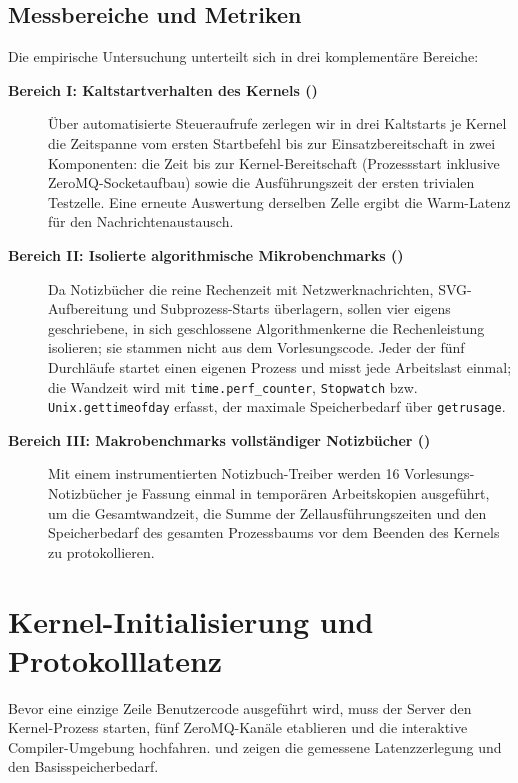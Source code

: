 \subsection{Messbereiche und Metriken}
Die empirische Untersuchung unterteilt sich in drei komplementäre Bereiche:
\begin{description}
  \item[\textbf{Bereich I: Kaltstartverhalten des Kernels ()}] 
  Über automatisierte Steueraufrufe zerlegen wir in drei Kaltstarts je Kernel die Zeitspanne vom ersten Startbefehl bis zur Einsatzbereitschaft in zwei Komponenten: die Zeit bis zur Kernel-Bereitschaft (Prozessstart inklusive ZeroMQ-Socketaufbau) sowie die Ausführungszeit der ersten trivialen Testzelle.
  Eine erneute Auswertung derselben Zelle ergibt die Warm-Latenz für den Nachrichtenaustausch.

  \item[\textbf{Bereich II: Isolierte algorithmische Mikrobenchmarks ()}]
  Da Notizbücher die reine Rechenzeit mit Netzwerknachrichten, SVG-Aufbereitung und Subprozess-Starts überlagern, sollen vier eigens geschriebene, in sich geschlossene Algorithmenkerne die Rechenleistung isolieren; sie stammen nicht aus dem Vorlesungscode.
  Jeder der fünf Durchläufe startet einen eigenen Prozess und misst jede Arbeitslast einmal; die Wandzeit wird mit \texttt{time.perf\_counter}, \texttt{Stopwatch} bzw. \texttt{Unix.gettimeofday} erfasst, der maximale Speicherbedarf über \texttt{getrusage}.

  \item[\textbf{Bereich III: Makrobenchmarks vollständiger Notizbücher ()}]
  Mit einem instrumentierten Notizbuch-Treiber werden 16 Vorlesungs-Notizbücher je Fassung einmal in temporären Arbeitskopien ausgeführt, um die Gesamtwandzeit, die Summe der Zellausführungszeiten und den Speicherbedarf des gesamten Prozessbaums vor dem Beenden des Kernels zu protokollieren.
\end{description}

\section{Kernel-Initialisierung und Protokolllatenz}
\label{sec:kernel_latency}

Bevor eine einzige Zeile Benutzercode ausgeführt wird, muss der Server den Kernel-Prozess starten, fünf ZeroMQ-Kanäle etablieren und die interaktive Compiler-Umgebung hochfahren.
 und  zeigen die gemessene Latenzzerlegung und den Basisspeicherbedarf.

